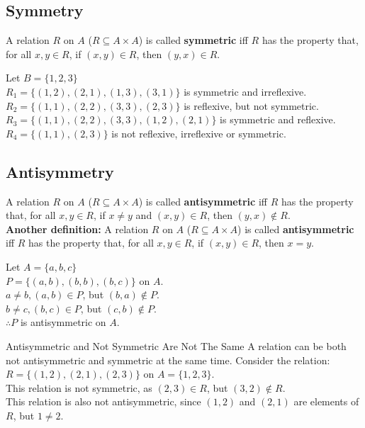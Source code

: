 \documentclass[../notes.tex]{subfiles}
\begin{document}
			\subsection{Symmetry}
				A relation $R$ on $A$ ($R \subseteq A \times A$) is called \textbf{symmetric} iff $R$ has the property that, for all $x, y \in R$, if $(x, y) \in R$, then $(y, x) \in R$.
				\begin{examplebox}
					Let $B = \{1, 2, 3\}$\\
					$R_{1} = \bigl\{(1, 2), (2, 1), (1, 3), (3, 1)\bigr\}$ is symmetric and irreflexive.\\
					$R_{2} = \bigl\{(1, 1), (2, 2), (3, 3), (2, 3)\bigr\}$ is reflexive, but not symmetric.\\
					$R_{3} = \bigl\{(1, 1), (2, 2), (3, 3), (1, 2), (2, 1)\bigr\}$ is symmetric and reflexive.\\
					$R_{4} = \bigl\{(1, 1), (2, 3)\bigr\}$ is not reflexive, irreflexive or symmetric.
				\end{examplebox}
				\pagebreak
			\subsection{Antisymmetry}
				A relation $R$ on $A$ ($R \subseteq A \times A$) is called \textbf{antisymmetric} iff $R$ has the property that, for all $x, y \in R$, if $x \neq y$ and $(x, y) \in R$, then $(y, x) \notin R$.\\
				\textbf{Another definition:} A relation $R$ on $A$ ($R \subseteq A \times A$) is called \textbf{antisymmetric} iff $R$ has the property that, for all $x, y \in R$, if $(x, y) \in R$, then $x = y$.
				\begin{examplebox}
					Let $A = \{a, b, c\}$\\
					$P = \bigl\{(a, b), (b, b), (b, c)\bigr\}$ on $A$.\\
					$a \neq b, (a, b) \in P$, but $(b, a) \notin P$.\\
					$b \neq c, (b, c) \in P$, but $(c, b) \notin P$.\\
					$\therefore P$ is antisymmetric on $A$.
				\end{examplebox}
				\begin{notebox}{Antisymmetric and Not Symmetric Are Not The Same}
					A relation can be both not antisymmetric and symmetric at the same time. Consider the relation:\\
					$R = \{(1, 2), (2, 1), (2, 3)\}$ on $A = \{1, 2, 3\}$.\\
					This relation is not symmetric, as $(2, 3) \in R$, but $(3, 2) \notin R$.\\
					This relation is also not antisymmetric, since $(1, 2)$ and $(2, 1)$ are elements of $R$, but $1 \neq 2$.
				\end{notebox}
\end{document}

